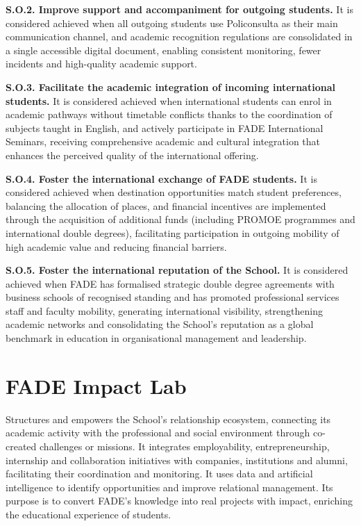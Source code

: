 \documentclass[11pt,a4paper]{scrreprt}
\begin{document}
\textbf{S.O.2. Improve support and accompaniment for outgoing students.} It is considered achieved when all outgoing students use Policonsulta as their main communication channel, and academic recognition regulations are consolidated in a single accessible digital document, enabling consistent monitoring, fewer incidents and high-quality academic support.

\textbf{S.O.3. Facilitate the academic integration of incoming international students.} It is considered achieved when international students can enrol in academic pathways without timetable conflicts thanks to the coordination of subjects taught in English, and actively participate in FADE International Seminars, receiving comprehensive academic and cultural integration that enhances the perceived quality of the international offering.

\textbf{S.O.4. Foster the international exchange of FADE students.} It is considered achieved when destination opportunities match student preferences, balancing the allocation of places, and financial incentives are implemented through the acquisition of additional funds (including PROMOE programmes and international double degrees), facilitating participation in outgoing mobility of high academic value and reducing financial barriers.

\textbf{S.O.5. Foster the international reputation of the School.} It is considered achieved when FADE has formalised strategic double degree agreements with business schools of recognised standing and has promoted professional services staff and faculty mobility, generating international visibility, strengthening academic networks and consolidating the School's reputation as a global benchmark in education in organisational management and leadership.
\clearpage

\chapter[FADE Impact Lab]{\textcolor{filcolor}{FADE Impact Lab}}
\begin{tcolorbox}[descbox]
\small Structures and empowers the School's relationship ecosystem, connecting its academic activity with the professional and social environment through co-created challenges or missions. It integrates employability, entrepreneurship, internship and collaboration initiatives with companies, institutions and alumni, facilitating their coordination and monitoring. It uses data and artificial intelligence to identify opportunities and improve relational management. Its purpose is to convert FADE's knowledge into real projects with impact, enriching the educational experience of students.
\end{tcolorbox}
\end{document}
